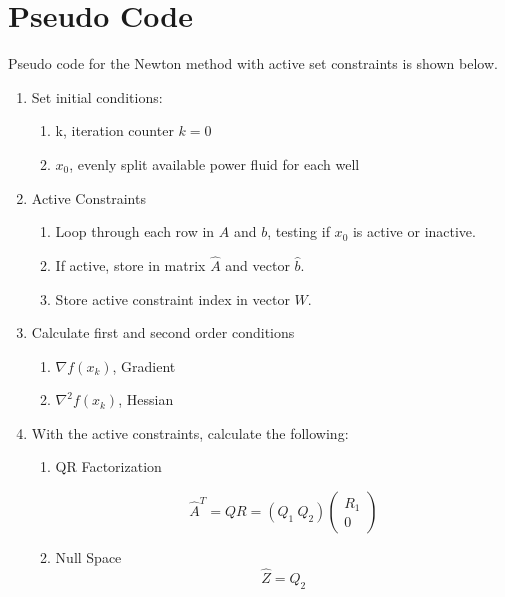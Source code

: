 \documentclass{article}
\begin{document}
\section{Pseudo Code}

Pseudo code for the Newton method with active set constraints is shown below.

\begin{enumerate}
    \item Set initial conditions:
    \begin{enumerate}
        \item k, iteration counter $k=0$
        \item $x_{0}$, evenly split available power fluid for each well
    \end{enumerate}
    
    \item Active Constraints
    \begin{enumerate}
        \item Loop through each row in $A$ and $b$, testing if $x_{0}$ is active or inactive.
        \item If active, store in matrix $\hat{A}$ and vector $\hat{b}$.
        \item Store active constraint index in vector $W$.
    \end{enumerate}

    \item Calculate first and second order conditions

    \begin{enumerate}
        \item $\nabla f(x_{k})$, Gradient
        \item $\nabla^2 f(x_{k})$, Hessian
    \end{enumerate}
    
    \item With the active constraints, calculate the following:

    \begin{enumerate}
        \item QR Factorization
    
        \begin{equation*}
            \hat{A}^T = QR = (Q_1 \: Q_2) \begin{pmatrix} R_1 \\ 0 \end{pmatrix}
        \end{equation*}
        
        \item Null Space
            $$\hat{Z} = Q_{2}$$
    

\end{enumerate}
\end{enumerate}
\end{document}
